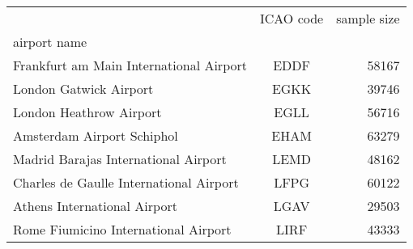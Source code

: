 \begin{tabular}{lcr}
\toprule
{} & ICAO code &  sample size \\
airport name                            &           &              \\
\midrule
Frankfurt am Main International Airport &      EDDF &        58167 \\
London Gatwick Airport                  &      EGKK &        39746 \\
London Heathrow Airport                 &      EGLL &        56716 \\
Amsterdam Airport Schiphol              &      EHAM &        63279 \\
Madrid Barajas International Airport    &      LEMD &        48162 \\
Charles de Gaulle International Airport &      LFPG &        60122 \\
Athens International Airport            &      LGAV &        29503 \\
Rome Fiumicino International Airport    &      LIRF &        43333 \\
\bottomrule
\end{tabular}
